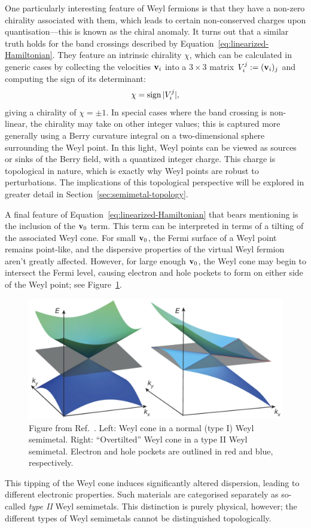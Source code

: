 One particularly interesting feature of Weyl fermions is that they have a non-zero chirality associated with them, which leads to certain non-conserved charges upon quantisation---this is known as the chiral anomaly. It turns out that a similar truth holds for the band crossings described by Equation~\eqref{eq:linearized-Hamiltonian}. They feature an intrinsic chirality $\chi$, which can be calculated in generic cases by collecting the velocities $\vb{v}_i$ into a $3\times 3$ matrix $V_i^j := (\vb{v}_i)_j$ and computing the sign of its determinant:
\begin{equation}\label{eq:determinant_chirality}
	\chi = \operatorname{sign}{|V_i^j|},
\end{equation} 
giving a chirality of $\chi=\pm1$. In special cases where the band crossing is non-linear, the chirality may take on other integer values; this is captured more generally using a Berry curvature integral on a two-dimensional sphere surrounding the Weyl point. In this light, Weyl points can be viewed as sources or sinks of the Berry field, with a quantized integer charge. This charge is topological in nature, which is exactly why Weyl points are robust to perturbations. The implications of this topological perspective will be explored in greater detail in Section~\ref{sec:semimetal-topology}.

A final feature of Equation~\eqref{eq:linearized-Hamiltonian} that bears mentioning is the inclusion of the $\vb{v}_0$ term. This term can be interpreted in terms of a tilting of the associated Weyl cone. For small $\vb{v}_0$, the Fermi surface of a Weyl point remains point-like, and the dispersive properties of the virtual Weyl fermion aren't greatly affected. However, for large enough $\vb{v}_0$, the Weyl cone may begin to intersect the Fermi level, causing electron and hole pockets to form on either side of the Weyl point; see Figure~\ref{fig:Weyl-cone-tilt}.
\begin{figure}[htb!]
	\centering
	\includegraphics[width=.7\linewidth]{Images/Weyl-cone-tilt}
	\caption{Figure from Ref.~\cite{Soluyanov_Type-II}. Left: Weyl cone in a normal (type I) Weyl semimetal. Right: ``Overtilted'' Weyl cone in a type II Weyl semimetal. Electron and hole pockets are outlined in red and blue, respectively.}
	\label{fig:Weyl-cone-tilt}
\end{figure} %
This tipping of the Weyl cone induces significantly altered dispersion, leading to different electronic properties. Such materials are categorised separately as so-called \emph{type II} Weyl semimetals. %
This distinction is purely physical, however; the different types of Weyl semimetals cannot be distinguished topologically.

